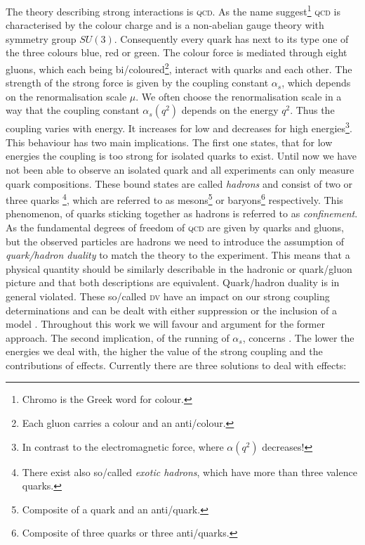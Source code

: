\documentclass[../../index.tex]{subfiles}
\begin{document}
The theory describing strong interactions is \textsc{qcd}. As the name
suggest\footnote{Chromo is the Greek word for colour.} \textsc{qcd} is
characterised by the colour charge and is a non-abelian gauge theory with
symmetry group \(SU(3)\). Consequently every quark has next to its type one of
the three colours blue, red or green. The colour force is mediated through eight
gluons, which each being bi\-/coloured\footnote{Each gluon carries a colour and
  an anti\-/colour.}, interact with quarks and each other. The strength of the
strong force is given by the coupling constant \(\alpha_s\), which depends on
the renormalisation scale \(\mu\). We often choose the renormalisation scale in
a way that the coupling constant \(\alpha_s(q^2)\) depends on the energy
\(q^2\). Thus the coupling varies with energy. It increases for low and
decreases for high energies\footnote{In contrast to the electromagnetic force,
  where \(\alpha(q^2)\) decreases!}. This behaviour has two main implications.
The first one states, that for low energies the coupling is too strong for
isolated quarks to exist. Until now we have not been able to observe an isolated
quark and all experiments can only measure quark compositions. These bound
states are called \textit{hadrons} and consist of two or three quarks
\footnote{There exist also so\-/called \textit{exotic hadrons}, which have more
  than three valence quarks.}, which are referred to as
mesons\footnote{Composite of a quark and an anti\-/quark.} or
baryons\footnote{Composite of three quarks or three anti\-/quarks.}
respectively. This phenomenon, of quarks sticking together as hadrons is
referred to as \textit{confinement}. As the fundamental degrees of freedom of
\textsc{qcd} are given by quarks and gluons, but the observed particles are
hadrons we need to introduce the assumption of \textit{quark\-/hadron duality}
to match the theory to the experiment. This means that a physical quantity
should be similarly describable in the hadronic or quark\-/gluon picture and
that both descriptions are equivalent. Quark\-/hadron duality is in general
violated. These so\-/called \textsc{dv} have an impact on our strong coupling
determinations and can be dealt with either suppression or the inclusion of a
model \cite{Cata2008}. Throughout this work we will favour and argument for the
former approach. The second implication, of the running of \(\alpha_s\),
concerns . The lower the energies we deal with, the higher the value
of the strong coupling and the contributions of 
effects. Currently there are three solutions to deal with  effects:
\end{document}

